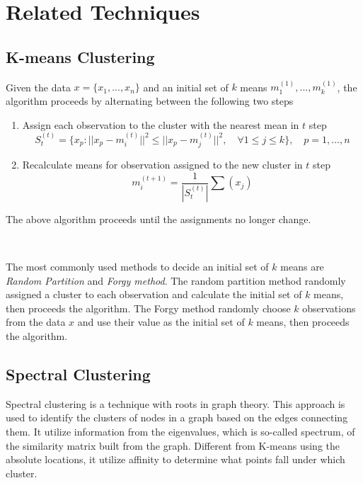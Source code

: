 \documentclass[a4paper]{article}
\begin{document}
\section{Related Techniques}

\subsection{K-means Clustering}

Given the data $x = \{ x_1, ..., x_n\}$ and an initial set of $k$ means $m_1^{(1)}, ..., m_k^{(1)}$, the algorithm proceeds by alternating between the following two steps
\begin{enumerate}
	\item Assign each observation to the cluster with the nearest mean in $t$ step
		\begin{equation}
			S_t^{(t)} = \{ x_p : || x_p - m_i^{(t)} ||^2 \leq || x_p - m_j^{(t)} ||^2  , \quad \forall 1\leq j \leq k \}, \quad p = 1, ..., n
		\end{equation}
	\item Recalculate means for observation assigned to the new cluster in $t$ step
		\begin{equation}
			m_i^{(t+1)} = \frac{1}{ | S_t^{(t)} | } \sum (x_j)
		\end{equation}
\end{enumerate}
The above algorithm proceeds until the assignments no longer change.

\

The most commonly used methods to decide an initial set of $k$ means are \textit{Random Partition} and \textit{Forgy method}. The random partition method randomly assigned a cluster to each observation and calculate the initial set of $k$ means, then proceeds the algorithm. The Forgy method randomly choose $k$ observations from the data $x$ and use their value as the initial set of $k$ means, then proceeds the algorithm.

\subsection{Spectral Clustering}

Spectral clustering is a technique with roots in graph theory. This approach is used to identify the clusters of nodes in a graph based on the edges connecting them. It utilize information from the eigenvalues, which is so-called spectrum, of the similarity matrix built from the graph. Different from K-means using the absolute locations, it utilize affinity to determine what points fall under which cluster.
\end{document}
